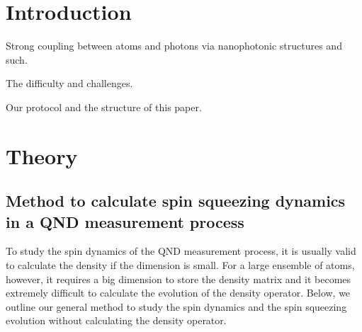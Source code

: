 \documentclass[preprint,aps,pra,onecolumn,superscriptaddress]{revtex4-1} %
\begin{document}
\section{Introduction}

Strong coupling between atoms and photons via nanophotonic structures and such.

The difficulty and challenges.

Our protocol and the structure of this paper.


\section{Theory} \label{Sec::Theory}

\subsection{Method to calculate spin squeezing dynamics in a QND measurement process}
To study the spin dynamics of the QND measurement process, it is usually valid to calculate the density if the dimension is small. 
For a large ensemble of atoms, however, it requires a big dimension to store the density matrix and it becomes extremely difficult to calculate the evolution of the density operator.
Below, we outline our general method to study the spin dynamics and the spin squeezing evolution without calculating the density operator.
\end{document}
